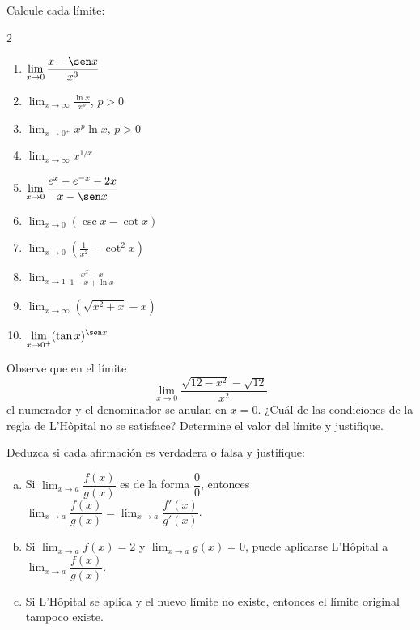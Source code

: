 \begin{prob}
Calcule cada límite:
\begin{multicols}{2}
\begin{enumerate}
    \item $\displaystyle\lim_{x\to 0}\frac{x-\sen x}{x^3}$
    \item $\displaystyle\lim_{x\to\infty}\frac{\ln x}{x^p}$, $p>0$
    \item $\displaystyle\lim_{x\to 0^+}x^p\ln x$, $p>0$
    \item $\displaystyle\lim_{x\to\infty}x^{1/x}$
    \item $\displaystyle\lim_{x\to 0}\frac{e^x-e^{-x}-2x}{x-\sen x}$
    \item $\displaystyle\lim_{x\to 0}(\csc x - \cot x)$
    \item $\displaystyle\lim_{x\to 0}\left(\frac{1}{x^2}-\cot^2 x\right)$
    \item $\displaystyle\lim_{x\to 1}\frac{x^x-x}{1-x+\ln x}$
    \item $\displaystyle\lim_{x\to\infty}\left(\sqrt{x^2+x}-x\right)$
    \item $\displaystyle\lim_{x\to 0^+}(\tan x)^{\sen x}$
\end{enumerate}
\end{multicols}
\end{prob}

\begin{prob}
Observe que en el límite
\[
\lim_{x\to 0}\frac{\sqrt{12-x^2}-\sqrt{12}}{x^2}
\]
el numerador y el denominador se anulan en $x=0$. ¿Cuál de las
condiciones de la regla de L'Hôpital no se satisface? Determine el
valor del límite y justifique.
\end{prob}

\begin{prob}
Deduzca si cada afirmación es verdadera o falsa y justifique:
\begin{enumerate}[a)]
    \item Si $\lim_{x\to a}\dfrac{f(x)}{g(x)}$ es de la forma
    $\dfrac{0}{0}$, entonces $\lim_{x\to a}\dfrac{f(x)}{g(x)}
    = \lim_{x\to a}\dfrac{f'(x)}{g'(x)}$.
    \item Si $\lim_{x\to a}f(x)=2$ y $\lim_{x\to a}g(x)=0$, puede
    aplicarse L'Hôpital a $\lim_{x\to a}\dfrac{f(x)}{g(x)}$.
    \item Si L'Hôpital se aplica y el nuevo límite no existe, entonces
    el límite original tampoco existe.
\end{enumerate}
\end{prob}

